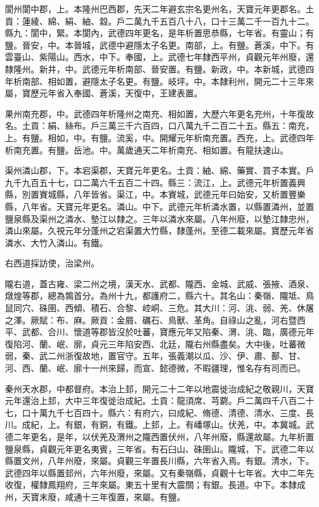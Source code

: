 \begin{pinyinscope}
 閬州閬中郡，上。本隆州巴西郡，先天二年避玄宗名更州名，天寶元年更郡名。土貢：蓮綾、綿、絹、紬、縠。戶二萬九千五百八十八，口十三萬二千一百九十二。縣九：閬中，緊。本閬內，武德四年更名，是年析置思恭縣，七年省。有靈山；有鹽。晉安，中。本晉城，武德中避隱太子名更。南部，上。有鹽。蒼溪，中下。有雲臺山、紫陽山。西水，中下。奉國，上。武德七年隸西平州，貞觀元年州廢，還隸隆州。新井，中。武德元年析南部、晉安置。有鹽。新政，中。本新城，武德四年析南部、相如置，避隱太子名更。有鹽。岐坪。中。本隸利州，開元二十三年來屬，寶歷元年省入奉國、蒼溪，天復中，王建表置。



 果州南充郡，中。武德四年析隆州之南充、相如置，大歷六年更名充州，十年復故名。土貢：絹、絲布。戶三萬三千六百四，口八萬九千二百二十五。縣五：南充，上。有鹽。相如，中。有鹽。流奚，中。開耀元年析南充置。西充，上。武德四年析南充置。有鹽。岳池。中。萬歲通天二年析南充、相如置。有龍扶速山。



 渠州潾山郡，下。本宕渠郡，天寶元年更名。土貢：紬、綿、藥實、買子本實。戶九千九百五十七，口二萬六千五百二十四。縣三：流江，上。武德元年析置義興縣，別置賨城縣，八年皆省。渠江，中。本賨城，武德元年曰始安，又析置豐樂縣，八年省。天寶元年更名。潾山。中下。武德元年析潾水置，以縣置潾州，並置鹽泉縣及渠州之潾水、墊江以隸之。三年以潾水來屬。八年州廢，以墊江隸忠州，潾山來屬。久視元年分蓬州之宕渠置大竹縣，隸蓬州。至德二載來屬。寶歷元年省潾水、大竹入潾山。有鐵。



 右西道採訪使，治梁州。



 隴右道，蓋古雍、梁二州之境，漢天水、武都、隴西、金城、武威、張掖、酒泉、燉煌等郡，總為鶉首分。為州十九，都護府二，縣六十。其名山：秦嶺、隴坻、鳥鼠同穴、硃圉、西傾、積石、合黎、崆峒、三危。其大川：河、洮、弱、羌、休屠之澤。厥賦：布、麻。厥貢：金屑、礪石、鳥獸、革角。自祿山之亂，河右暨西平、武都、合川、懷道等郡皆沒於吐蕃，寶應元年又陷秦、渭、洮、臨，廣德元年復陷河、蘭、岷、廓，貞元三年陷安西、北廷，隴右州縣盡矣。大中後，吐蕃微弱，秦、武二州浙復故地，置官守。五年，張義潮以瓜、沙、伊、肅、鄯、甘、河、西、蘭、岷、廓十一州來歸，而宣、懿德微，不暇疆理，惟名存有司而已。



 秦州天水郡，中都督府。本治上邽，開元二十二年以地震徙治成紀之敬親川，天寶元年還治上邽，大中三年復徙治成紀。土貢：龍須席、芎藭。戶二萬四千八百二十七，口十萬九千七百四十。縣六：有府六，曰成紀、脩德、清德、清水、三度、長川。成紀，上。有銀，有銅，有鐵。上邽，上。有嶓塚山。伏羌，中。本冀城。武德二年更名，是年，以伏羌及渭州之隴西置伏州，八年州廢，縣還故屬。九年析置鹽泉縣，貞觀元年更名夷賓，三年省。有石臼山、硃圉山。隴城，下。武德二年以縣置文州，八年州廢，來屬。貞觀三年置長川縣，六年省入焉。有銀。清水，下。武德四年以縣置邽州，六年州廢，來屬。又有秦嶺縣，貞觀十七年省。大中二年先收復，權隸鳳翔府，三年來屬。東五十里有大震關；有銀。長道。中下。本隸成州，天寶末廢，咸通十三年復置，來屬。有鹽。




\end{pinyinscope}
